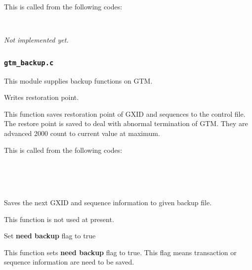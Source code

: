     This is called from the following codes:
    
    \FuncRefHdr
		\\ \hline
    \FuncRefTrailor
  
  
    \textit{Not implemented yet.}
  
  


\subsubsection{\texttt{gtm\_backup.c}}
  
  This module supplies backup functions on GTM.
  
  
    Writes restoration point.
    
    This function saves restoration point of GXID and sequences to the control file.
    The restore point is saved to deal with abnormal termination of GTM.
   	They are advanced 2000 count to current value at maximum.
    
    This is called from the following codes:
    
    \FuncRefHdr
		\\
		\\
		\\ \hline
    \FuncRefTrailor
  
  
    Saves the next GXID and sequence information to given backup file.
    
    This function is not used at present.
  
  
    Set \textbf{need backup} flag to true
    
    This function sets \textbf{need backup} flag to true.
    This flag means transaction or sequence information are need to be saved.
    
